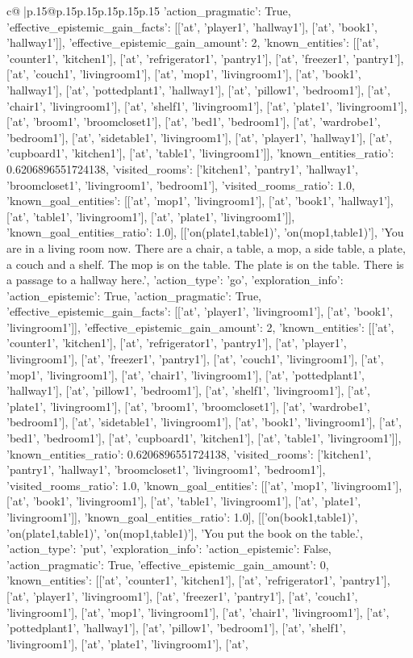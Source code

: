 \documentclass{article}
\begin{document}
{\begin{supertabular}{c@{$\;$}|p{.15\linewidth}@{}p{.15\linewidth}p{.15\linewidth}p{.15\linewidth}p{.15\linewidth}p{.15\linewidth}}
{{{'action_pragmatic': True, 'effective_epistemic_gain_facts': [['at', 'player1', 'hallway1'], ['at', 'book1', 'hallway1']], 'effective_epistemic_gain_amount': 2, 'known_entities': [['at', 'counter1', 'kitchen1'], ['at', 'refrigerator1', 'pantry1'], ['at', 'freezer1', 'pantry1'], ['at', 'couch1', 'livingroom1'], ['at', 'mop1', 'livingroom1'], ['at', 'book1', 'hallway1'], ['at', 'pottedplant1', 'hallway1'], ['at', 'pillow1', 'bedroom1'], ['at', 'chair1', 'livingroom1'], ['at', 'shelf1', 'livingroom1'], ['at', 'plate1', 'livingroom1'], ['at', 'broom1', 'broomcloset1'], ['at', 'bed1', 'bedroom1'], ['at', 'wardrobe1', 'bedroom1'], ['at', 'sidetable1', 'livingroom1'], ['at', 'player1', 'hallway1'], ['at', 'cupboard1', 'kitchen1'], ['at', 'table1', 'livingroom1']], 'known_entities_ratio': 0.6206896551724138, 'visited_rooms': ['kitchen1', 'pantry1', 'hallway1', 'broomcloset1', 'livingroom1', 'bedroom1'], 'visited_rooms_ratio': 1.0, 'known_goal_entities': [['at', 'mop1', 'livingroom1'], ['at', 'book1', 'hallway1'], ['at', 'table1', 'livingroom1'], ['at', 'plate1', 'livingroom1']], 'known_goal_entities_ratio': 1.0}}], [['on(plate1,table1)', 'on(mop1,table1)'], 'You are in a living room now. There are a chair, a table, a mop, a side table, a plate, a couch and a shelf. The mop is on the table. The plate is on the table. There is a passage to a hallway here.', {'action_type': 'go', 'exploration_info': {'action_epistemic': True, 'action_pragmatic': True, 'effective_epistemic_gain_facts': [['at', 'player1', 'livingroom1'], ['at', 'book1', 'livingroom1']], 'effective_epistemic_gain_amount': 2, 'known_entities': [['at', 'counter1', 'kitchen1'], ['at', 'refrigerator1', 'pantry1'], ['at', 'player1', 'livingroom1'], ['at', 'freezer1', 'pantry1'], ['at', 'couch1', 'livingroom1'], ['at', 'mop1', 'livingroom1'], ['at', 'chair1', 'livingroom1'], ['at', 'pottedplant1', 'hallway1'], ['at', 'pillow1', 'bedroom1'], ['at', 'shelf1', 'livingroom1'], ['at', 'plate1', 'livingroom1'], ['at', 'broom1', 'broomcloset1'], ['at', 'wardrobe1', 'bedroom1'], ['at', 'sidetable1', 'livingroom1'], ['at', 'book1', 'livingroom1'], ['at', 'bed1', 'bedroom1'], ['at', 'cupboard1', 'kitchen1'], ['at', 'table1', 'livingroom1']], 'known_entities_ratio': 0.6206896551724138, 'visited_rooms': ['kitchen1', 'pantry1', 'hallway1', 'broomcloset1', 'livingroom1', 'bedroom1'], 'visited_rooms_ratio': 1.0, 'known_goal_entities': [['at', 'mop1', 'livingroom1'], ['at', 'book1', 'livingroom1'], ['at', 'table1', 'livingroom1'], ['at', 'plate1', 'livingroom1']], 'known_goal_entities_ratio': 1.0}}], [['on(book1,table1)', 'on(plate1,table1)', 'on(mop1,table1)'], 'You put the book on the table.', {'action_type': 'put', 'exploration_info': {'action_epistemic': False, 'action_pragmatic': True, 'effective_epistemic_gain_amount': 0, 'known_entities': [['at', 'counter1', 'kitchen1'], ['at', 'refrigerator1', 'pantry1'], ['at', 'player1', 'livingroom1'], ['at', 'freezer1', 'pantry1'], ['at', 'couch1', 'livingroom1'], ['at', 'mop1', 'livingroom1'], ['at', 'chair1', 'livingroom1'], ['at', 'pottedplant1', 'hallway1'], ['at', 'pillow1', 'bedroom1'], ['at', 'shelf1', 'livingroom1'], ['at', 'plate1', 'livingroom1'], ['at', }}}
\end{supertabular}}
\end{document}
